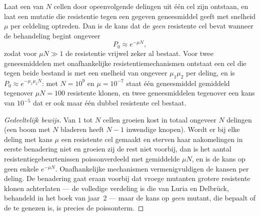 \begin{theorem}\label{thm:b3:cancer-biology:goldie-coldman}
Laat een  van $N$ cellen door opeenvolgende delingen uit één cel
zijn ontstaan, en laat een mutatie die resistentie tegen een gegeven
geneesmiddel geeft met snelheid $\mu$ per celdeling optreden. Dan is de
kans dat de  \emph{geen} resistente cel bevat wanneer de
behandeling begint ongeveer
\[
P_{0} \approx e^{-\mu N},
\]
zodat voor $\mu N \gg 1$ de resistentie vrijwel zeker al bestaat. Voor
twee geneesmiddelen met onafhankelijke resistentiemechanismen ontstaat
een cel die tegen beide bestand is met een snelheid van ongeveer
$\mu_{1}\mu_{2}$ per deling, en is $P_{0}
\approx e^{-\mu_{1}\mu_{2}N}$: met $N = 10^{9}$ en $\mu = 10^{-7}$ staat
één geneesmiddel gemiddeld tegenover $\mu N = 100$ resistente klonen,
en twee geneesmiddelen tegenover een kans van $10^{-5}$ dat er ook maar
één dubbel resistente cel bestaat.
\end{theorem}
\begin{proof}[Gedeeltelijk bewijs]
Van $1$ tot $N$ cellen groeien kost in totaal ongeveer $N$ delingen
(een boom met $N$ bladeren heeft $N - 1$ inwendige knopen). Wordt er bij
elke deling met kans $\mu$ een resistente cel gemaakt en sterven haar
nakomelingen in eerste benadering niet en groeien zij de rest niet
voorbij, dan is het aantal resistentiegebeurtenissen poissonverdeeld
met gemiddelde $\mu N$, en is de kans op geen enkele $e^{-\mu N}$.
Onafhankelijke mechanismen vermenigvuldigen de kansen per deling. De
benadering gaat eraan voorbij dat vroege mutanten grotere resistente
klonen achterlaten --- de volledige verdeling is die van Luria en
Delbrück, behandeld in het boek van jaar~2 --- maar de kans op
\emph{geen} mutant, die bepaalt of de  te genezen is, is precies
de poissonterm.
\end{proof}


